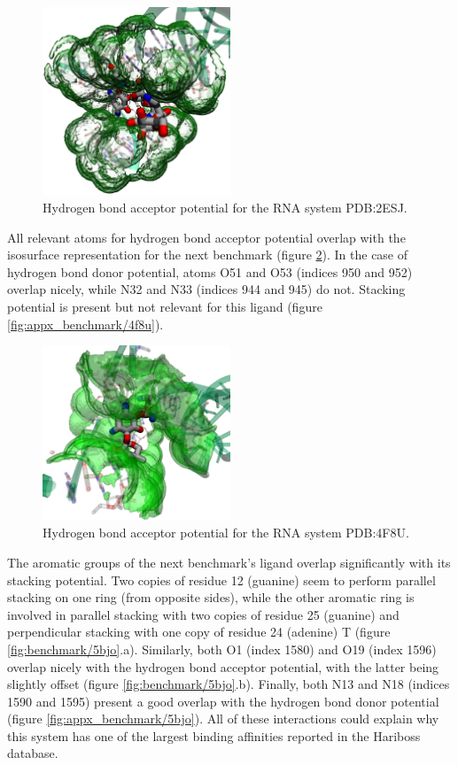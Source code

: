     \begin{figure}[H]
      \centering
      \includegraphics[width=0.5\textwidth]{figures/results/benchmark_rna/2esj.png}
      \caption{\label{fig:benchmark/2esj} Hydrogen bond acceptor potential for the RNA system PDB:2ESJ.}
    \end{figure}

    All relevant atoms for hydrogen bond acceptor potential overlap with the isosurface representation for the next benchmark (figure \ref{fig:benchmark/4f8u}). In the case of hydrogen bond donor potential, atoms O51 and O53 (indices 950 and 952) overlap nicely, while N32 and N33 (indices 944 and 945) do not. Stacking potential is present but not relevant for this ligand (figure \ref{fig:appx_benchmark/4f8u}).

    \begin{figure}[H]
      \centering
      \includegraphics[width=0.5\textwidth]{figures/results/benchmark_rna/4f8u.png}
      \caption{\label{fig:benchmark/4f8u} Hydrogen bond acceptor potential for the RNA system PDB:4F8U.}
    \end{figure}

    The aromatic groups of the next benchmark's ligand overlap significantly with its stacking potential. Two copies of residue 12 (guanine) seem to perform parallel stacking on one ring (from opposite sides), while the other aromatic ring is involved in parallel stacking with two copies of residue 25 (guanine) and perpendicular stacking with one copy of residue 24 (adenine) T (figure \ref{fig:benchmark/5bjo}.a). Similarly, both O1 (index 1580) and O19 (index 1596) overlap nicely with the hydrogen bond acceptor potential, with the latter being slightly offset (figure \ref{fig:benchmark/5bjo}.b). Finally, both N13 and N18 (indices 1590 and 1595) present a good overlap with the hydrogen bond donor potential (figure \ref{fig:appx_benchmark/5bjo}). All of these interactions could explain why this system has one of the largest binding affinities reported in the Hariboss database.

